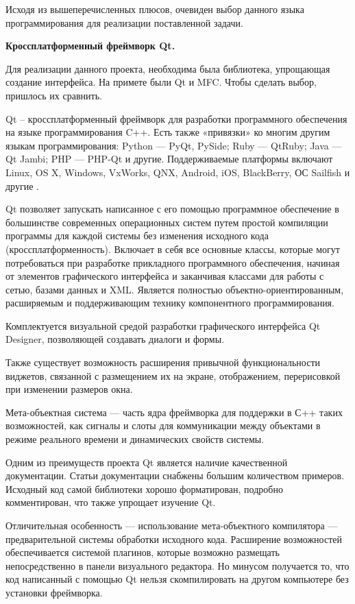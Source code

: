 Исходя из вышеперечисленных плюсов, очевиден выбор данного языка программирования для реализации поставленной задачи.

\noindent\textbf{Кроссплатформенный фреймворк Qt.}

Для реализации данного проекта, необходима была библиотека, упрощающая создание интерфейса. На примете были Qt и MFC. Чтобы сделать выбор, пришлось их сравнить. 

Qt – кроссплатформенный фреймворк для разработки программного обеспечения на языке программирования C++. Есть также «привязки» ко многим другим языкам программирования: Python — PyQt, PySide; Ruby — QtRuby; Java — Qt Jambi; PHP — PHP-Qt и другие. Поддерживаемые платформы включают Linux, OS X, Windows, VxWorks, QNX, Android, iOS, BlackBerry, ОС Sailfish и другие \cite{Qt}.

Qt позволяет запускать написанное с его помощью программное обеспечение в большинстве современных операционных систем путем простой компиляции программы для каждой системы без изменения исходного кода (кроссплатформенность). Включает в себя все основные классы, которые могут потребоваться при разработке прикладного программного обеспечения, начиная от элементов графического интерфейса и заканчивая классами для работы с сетью, базами данных и XML. Является полностью объектно-ориентированным, расширяемым и поддерживающим технику компонентного программирования.

Комплектуется визуальной средой разработки графического интерфейса Qt Designer, позволяющей создавать диалоги и формы.

Также существует возможность расширения привычной функциональности виджетов, связанной с размещением их на экране, отображением, перерисовкой при изменении размеров окна.

Мета-объектная система — часть ядра фреймворка для поддержки в С++ таких возможностей, как сигналы и слоты для коммуникации между объектами в режиме реального времени и динамических свойств системы.

Одним из преимуществ проекта Qt является наличие качественной документации. Статьи документации снабжены большим количеством примеров. Исходный код самой библиотеки хорошо форматирован, подробно комментирован, что также упрощает изучение Qt.

Отличительная особенность — использование мета-объектного компилятора — предварительной системы обработки исходного кода. Расширение возможностей обеспечивается системой плагинов, которые возможно размещать непосредственно в панели визуального редактора. Но минусом получается то, что код написанный с помощью Qt нельзя скомпилировать на другом компьютере без установки фреймворка.

